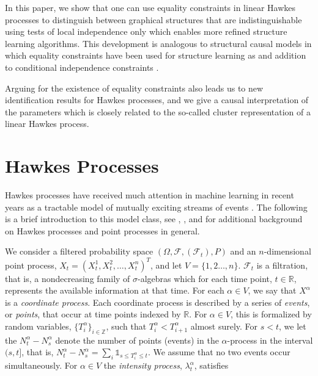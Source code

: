 \documentclass[accepted]{uai2021} %
\begin{document}
In this paper, we show that one can 
use equality 
constraints in linear Hawkes processes to distinguish between graphical 
structures that 
are indistinguishable using tests of local independence only which enables more 
refined structure learning algorithms. This development 
is analogous to structural causal models in which equality constraints have 
been used for structure learning as and addition to conditional independence 
constraints 
\citep{robins1986,vermaEquiAndSynthesis,robins1999,tian2002,shpitser2014,richardson2017}.

Arguing for the existence of equality constraints also leads us to new 
identification 
results for Hawkes processes, 
and we give a causal interpretation of the parameters which is closely 
related to the so-called cluster representation of a linear Hawkes process.




\section{Hawkes Processes}
\label{sec:hawPro}

Hawkes processes have received much attention in machine learning in recent 
years as a tractable model of mutually exciting streams of events 
\citep{zhou2013b,luo2015,etesami2016,tan2018,xu2018,trouleau2019}. 
The following is a brief introduction to this model class,
see \cite{laubHawkes2015}, \cite{linigerThesis}, and \cite{daleyVere} for 
additional background on Hawkes processes and point processes in general.

We consider a filtered probability space $(\Omega, \mathcal{F}, 
(\mathcal{F}_t), P)$ and an $n$-dimensional point process, $X_t = 
(X_t^1,X_t^2,\ldots,X_t^n)^T$, and let $V= \{1,2\ldots, n\}$. $\mathcal{F}_t$ 
is 
a filtration, that is, a nondecreasing family of $\sigma$-algebras which for 
each time point, $t\in \mathbb{R}$, represents the available information at 
that time. For each 
$\alpha\in 
V$, we say that $X^\alpha$ is a \emph{coordinate process}. Each coordinate 
process is described by a series of \emph{events}, or \emph{points}, that occur 
at time points indexed by $\mathbb{R}$. For $\alpha \in V$, this is formalized 
by random variables, $\{T_i^\alpha\}_{i\in\mathbb{Z}}$, such 
that $T_i^\alpha < T_{i+1}^\alpha$ almost surely. For $s<t$, we let the  
$N_t^\alpha - 
N_s^\alpha$ denote the number of points (events) in the $\alpha$-process 
in the interval $(s,t]$, that is,  $N_t^\alpha - 
N_s^\alpha= \sum_i \mathds{1}_{s \leq T_i^\alpha \leq t}$. We 
assume that no 
two events occur simultaneously. For 
$\alpha\in V$ the \emph{intensity process}, $\lambda_t^\alpha$, 
satisfies
\end{document}
